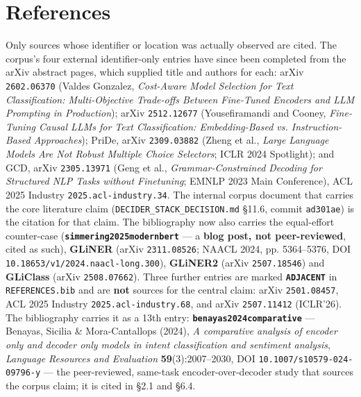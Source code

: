 \documentclass[11pt,a4paper]{article}
\begin{document}
\section*{References}
Only sources whose identifier or location was actually observed are cited. The corpus's four external identifier-only entries have since been completed from the arXiv abstract pages, which supplied title and authors for each: arXiv \texttt{2602.06370}\cite{arxiv2602_06370} (Valdes Gonzalez, \emph{Cost-Aware Model Selection for Text Classification: Multi-Objective Trade-offs Between Fine-Tuned Encoders and LLM Prompting in Production}); arXiv \texttt{2512.12677}\cite{arxiv2512_12677} (Yousefiramandi and Cooney, \emph{Fine-Tuning Causal LLMs for Text Classification: Embedding-Based vs. Instruction-Based Approaches}); PriDe, arXiv \texttt{2309.03882}\cite{pride2309_03882} (Zheng et al., \emph{Large Language Models Are Not Robust Multiple Choice Selectors}; ICLR 2024 Spotlight); and GCD, arXiv \texttt{2305.13971}\cite{gcd2305_13971} (Geng et al., \emph{Grammar-Constrained Decoding for Structured NLP Tasks without Finetuning}; EMNLP 2023 Main Conference), ACL 2025 Industry \texttt{2025.acl-industry.34}. The internal corpus document that carries the core literature claim (\texttt{DECIDER\_STACK\_DECISION.md} \S11.6, commit \texttt{ad301ae}) is the citation for that claim. The bibliography now also carries the equal-effort counter-case (\textbf{\texttt{simmering2025modernbert}\cite{simmering2025modernbert}} --- a \textbf{blog post, not peer-reviewed}, cited as such), \textbf{GLiNER} (arXiv \texttt{2311.08526}; NAACL 2024, pp. 5364--5376, DOI \texttt{10.18653/v1/2024.naacl-long.300}), \textbf{GLiNER2} (arXiv \texttt{2507.18546}) and \textbf{GLiClass} (arXiv \texttt{2508.07662}). Three further entries are marked \textbf{\texttt{ADJACENT}} in \texttt{REFERENCES.bib} and are \textbf{not} sources for the central claim: arXiv \texttt{2501.08457}, ACL 2025 Industry \texttt{2025.acl-industry.68}, and arXiv \texttt{2507.11412} (ICLR'26). The bibliography carries it as a 13th entry: \textbf{\texttt{benayas2024comparative}\cite{benayas2024comparative}} --- Benayas, Sicilia \& Mora-Cantallops (2024), \emph{A comparative analysis of encoder only and decoder only models in intent classification and sentiment analysis}, \emph{Language Resources and Evaluation} \textbf{59}(3):2007--2030, DOI \texttt{10.1007/s10579-024-09796-y} --- the peer-reviewed, same-task encoder-over-decoder study that sources the corpus claim; it is cited in \S2.1 and \S6.4.
\end{document}
